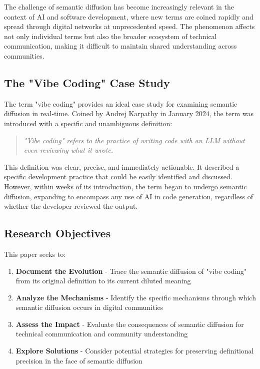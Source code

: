 \documentclass[11pt]{article}
\begin{document}
The challenge of semantic diffusion has become increasingly relevant in the context of AI and software development, where new terms are coined rapidly and spread through digital networks at unprecedented speed. The phenomenon affects not only individual terms but also the broader ecosystem of technical communication, making it difficult to maintain shared understanding across communities.

\subsection{The "Vibe Coding" Case Study}

The term "vibe coding" provides an ideal case study for examining semantic diffusion in real-time. Coined by Andrej Karpathy in January 2024, the term was introduced with a specific and unambiguous definition:

\begin{quote}
\emph{"Vibe coding" refers to the practice of writing code with an LLM without even reviewing what it wrote.}
\end{quote}

This definition was clear, precise, and immediately actionable. It described a specific development practice that could be easily identified and discussed. However, within weeks of its introduction, the term began to undergo semantic diffusion, expanding to encompass any use of AI in code generation, regardless of whether the developer reviewed the output.

\subsection{Research Objectives}

This paper seeks to:

\begin{enumerate}
\item \textbf{Document the Evolution} - Trace the semantic diffusion of "vibe coding" from its original definition to its current diluted meaning
\item \textbf{Analyze the Mechanisms} - Identify the specific mechanisms through which semantic diffusion occurs in digital communities
\item \textbf{Assess the Impact} - Evaluate the consequences of semantic diffusion for technical communication and community understanding
\item \textbf{Explore Solutions} - Consider potential strategies for preserving definitional precision in the face of semantic diffusion
\end{enumerate}
\end{document}
